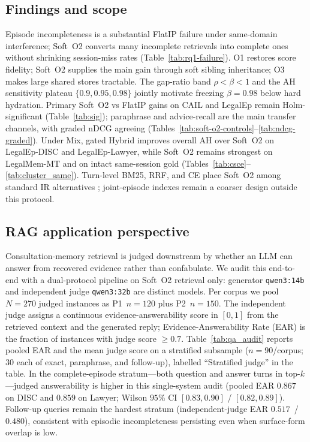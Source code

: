 \documentclass[preprint,12pt,authoryear]{elsarticle}
\begin{document}
\subsection{Findings and scope}
Episode incompleteness is a substantial FlatIP failure under same-domain interference; Soft~O2 converts many incomplete retrievals into complete ones without shrinking session-miss rates (Table~\ref{tab:rq1-failure}).
O1 restores score fidelity; Soft~O2 supplies the main gain through soft sibling inheritance; O3 makes large shared stores tractable.
The gap-ratio band $\rho{<}\beta{<}1$ and the AH sensitivity plateau $\{0.9,0.95,0.98\}$ jointly motivate freezing $\beta{=}0.98$ below hard hydration.
Primary Soft~O2 vs FlatIP gains on CAIL and LegalEp remain Holm-significant (Table~\ref{tab:sig}); paraphrase and advice-recall are the main transfer channels, with graded nDCG agreeing (Tables~\ref{tab:soft-o2-controls}--\ref{tab:ndcg-graded}).
Under Mix, gated Hybrid improves overall AH over Soft~O2 on LegalEp-DISC and LegalEp-Lawyer, while Soft~O2 remains strongest on LegalMem-MT and on intact same-session gold (Tables~\ref{tab:csce}--\ref{tab:cluster_same}).
Turn-level BM25, RRF, and CE place Soft~O2 among standard IR alternatives \cite{robertson2009bm25, cormack2009rrf, nogueira2019multistage}; joint-episode indexes remain a coarser design outside this protocol.

\subsection{RAG application perspective}\label{sec:rag-discussion}
Consultation-memory retrieval is judged downstream by whether an LLM can answer from recovered evidence rather than confabulate.
We audit this end-to-end with a dual-protocol pipeline on Soft~O2 retrieval only: generator \texttt{qwen3:14b} and independent judge \texttt{qwen3:32b} are distinct models.
Per corpus we pool $N{=}270$ judged instances as P1~$n{=}120$ plus P2~$n{=}150$.
The independent judge assigns a continuous evidence-answerability score in $[0,1]$ from the retrieved context and the generated reply; Evidence-Answerability Rate (EAR) is the fraction of instances with judge score $\ge 0.7$.
Table~\ref{tab:qa_audit} reports pooled EAR and the mean judge score on a stratified subsample ($n{=}90$/corpus; $30$ each of exact, paraphrase, and follow-up), labelled ``Stratified judge'' in the table.
In the complete-episode stratum---both question and answer turns in top-$k$---judged answerability is higher in this single-system audit (pooled EAR $0.867$ on DISC and $0.859$ on Lawyer; Wilson $95\%$ CI $[0.83,0.90]$ / $[0.82,0.89]$).
Follow-up queries remain the hardest stratum (independent-judge EAR $0.517$~/~$0.480$), consistent with episodic incompleteness persisting even when surface-form overlap is low.
\end{document}

